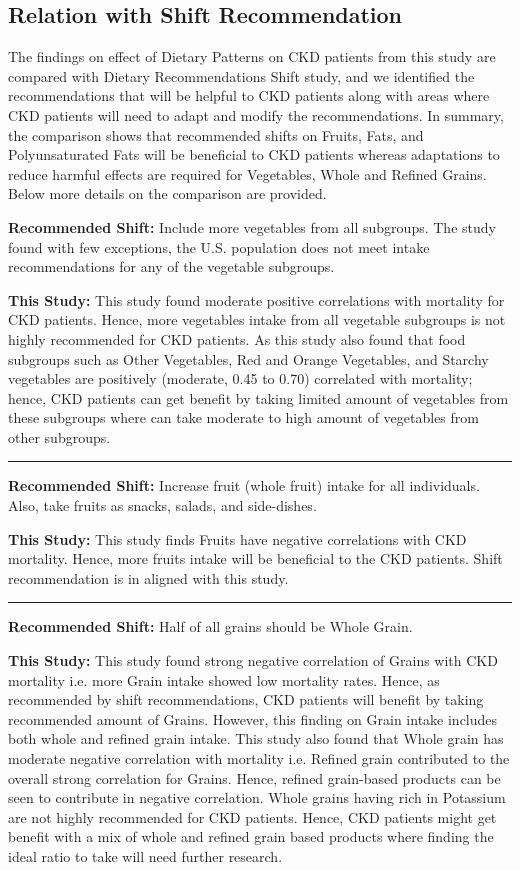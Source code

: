 \subsection *{Relation with Shift Recommendation}
The findings on effect of Dietary Patterns  on CKD patients from this study are compared with Dietary Recommendations Shift study, and we identified the recommendations that will be helpful to CKD patients along with areas where CKD patients will need to adapt and modify the recommendations. In summary, the comparison shows that recommended shifts on Fruits, Fats, and Polyunsaturated Fats will be beneficial to CKD patients whereas adaptations to reduce harmful effects are required for Vegetables, Whole and Refined Grains. Below more details on the comparison are provided. 

\noindent \noindent \textbf{Recommended Shift:} Include more vegetables from all subgroups. The study found with few exceptions, the U.S. population does not meet intake recommendations for any of the vegetable subgroups.

\noindent \textbf{This Study:} This study found moderate positive correlations with mortality for CKD patients. Hence, more vegetables intake from all vegetable subgroups is not highly recommended  for CKD patients. As this study also found that food subgroups such as Other Vegetables, Red and Orange Vegetables, and Starchy vegetables are positively (moderate, 0.45 to 0.70) correlated with mortality; hence, CKD patients can get benefit by taking limited amount of vegetables from these subgroups where can take moderate to high amount of vegetables from other subgroups.

\noindent\rule{9cm}{0.4pt}

\noindent \textbf{Recommended Shift:} Increase fruit (whole fruit) intake for all individuals. Also, take fruits as snacks, salads, and side-dishes.

\noindent \textbf{This Study:} This study finds Fruits have negative correlations with CKD mortality. Hence, more fruits intake will be beneficial to the CKD patients. Shift recommendation is in aligned with this study.

\noindent\rule{9cm}{0.4pt}

\noindent \textbf{Recommended Shift:} Half of all grains should be Whole Grain.

\noindent \textbf{This Study:} This study found strong negative correlation of Grains with CKD mortality i.e. more Grain intake showed low mortality rates. Hence, as recommended by shift recommendations, CKD patients will benefit by taking recommended amount of Grains. However, this finding on Grain intake includes both whole and refined grain intake. This study also found that Whole grain has moderate negative correlation with mortality i.e. Refined grain contributed to the overall strong correlation for Grains. Hence, refined grain-based products can be seen to contribute in negative correlation. Whole grains having rich in Potassium are not highly recommended for CKD patients. Hence, CKD patients might get benefit with a mix of whole and refined grain based products where finding the ideal ratio to take will need further research.

